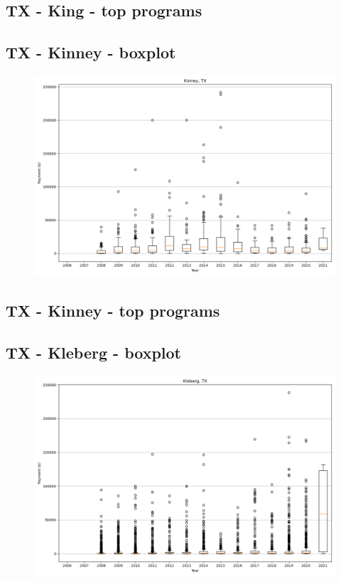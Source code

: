\subsection*{TX - King - top programs}

\newpage
\subsection*{TX - Kinney - boxplot}
\begin{figure}[h]
\centering
\includegraphics[width=7in]{../output/boxplots/counties/Kinney-TX_boxplot.png}
\end{figure}


\subsection*{TX - Kinney - top programs}

\newpage
\subsection*{TX - Kleberg - boxplot}
\begin{figure}[h]
\centering
\includegraphics[width=7in]{../output/boxplots/counties/Kleberg-TX_boxplot.png}
\end{figure}


